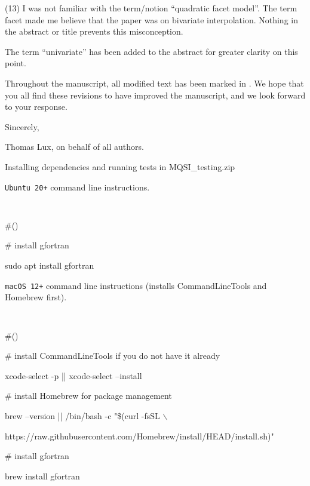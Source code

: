 \goodbreak
{\parindent=20pt \it
  
\item{(13)} I was not familiar with the term/notion ``quadratic facet
  model''. The term facet made me believe that the paper was on
  bivariate interpolation. Nothing in the abstract or title prevents
  this misconception.

}

The term ``univariate'' has been added to the abstract for greater
clarity on this point.

\vfill \eject

Throughout the manuscript, all modified text has been marked in
. We hope that you all find these revisions to have improved
the manuscript, and we look forward to your response.

Sincerely,

Thomas Lux, on behalf of all authors.

\vfill

{\headingbf Installing dependencies and running tests in} {\hskip 2mm} {\headingtt MQSI\_testing.zip}

\vskip 5mm

{\tt Ubuntu 20+} command line instructions.

{\parskip=2pt \parindent=20pt \tt
\item{} \#() 
\item{} \textMaroon \# install gfortran \textBlack
\item{} sudo apt install gfortran
}

\vskip 5mm

{\tt macOS 12+} command line instructions (installs CommandLineTools and Homebrew first).

{\parskip=2pt \parindent=20pt \tt
\item{} \#() 
\item{} \textMaroon \# install CommandLineTools if you do not have it already \textBlack
\item{} xcode-select -p || xcode-select --install
\item{} \textMaroon \# install Homebrew for package management \textBlack
\item{} brew --version || /bin/bash -c "\$(curl -fsSL $\backslash$
\item{} \hskip 10mm https://raw.githubusercontent.com/Homebrew/install/HEAD/install.sh)"
\item{} \textMaroon \# install gfortran \textBlack
\item{} brew install gfortran
}


